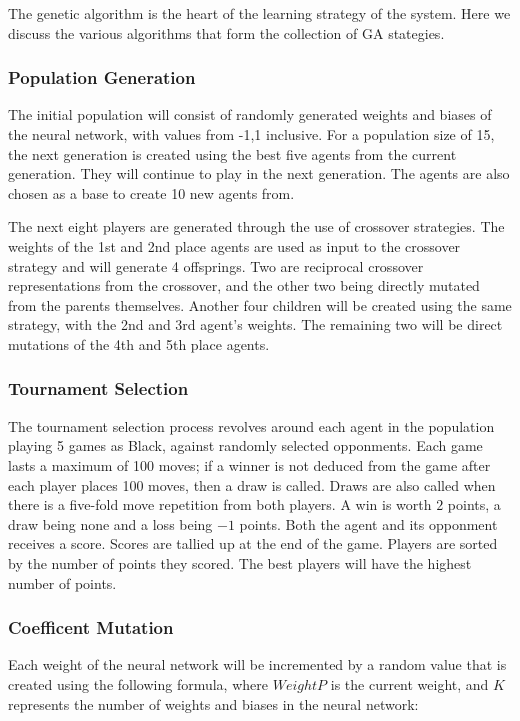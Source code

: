 \documentclass[12pt,a4paper]{article}
\begin{document}
    The genetic algorithm is the heart of the learning strategy of the system. Here we discuss the various algorithms that form the collection of GA stategies.

\subsubsection{Population Generation}

    The initial population will consist of randomly generated weights and biases of the neural network, with values from -1,1 inclusive. For a population size of 15, the next generation is created using the best five agents from the current generation. They will continue to play in the next generation. The agents are also chosen as a base to create 10 new agents from.

    The next eight players are generated through the use of crossover strategies. The weights of the 1st and 2nd place agents are used as input to the crossover strategy and will generate 4 offsprings. Two are reciprocal crossover representations from the crossover, and the other two being directly mutated from the parents themselves. Another four children will be created using the same strategy, with the 2nd and 3rd agent's weights.
    The remaining two will be direct mutations of the 4th and 5th place agents.

\subsubsection{Tournament Selection}

    The tournament selection process revolves around each agent in the population playing 5 games as Black, against randomly selected opponments. Each game lasts a maximum of 100 moves; if a winner is not deduced from the game after each player places 100 moves, then a draw is called. Draws are also called when there is a five-fold move repetition from both players. A win is worth $2$ points, a draw being none and a loss being $-1$ points. Both the agent and its opponment receives a score. Scores are tallied up at the end of the game. Players are sorted by the number of points they scored. The best players will have the highest number of points.

\subsubsection{Coefficent Mutation}

    Each weight of the neural network will be incremented by a random value that is created using the following formula, where $WeightP$ is the current weight, and $K$ represents the number of weights and biases in the neural network:
\end{document}
